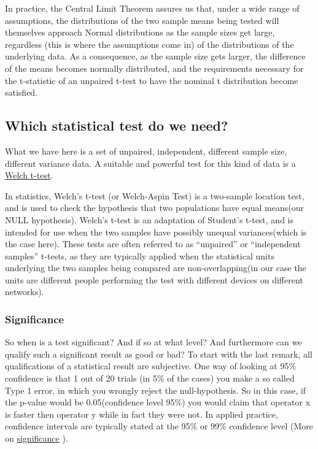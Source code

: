 \documentclass[]{article}
\begin{document}
In practice, the Central Limit Theorem assures us that, under a wide
range of assumptions, the distributions of the two sample means being
tested will themselves approach Normal distributions as the sample sizes
get large, regardless (this is where the assumptions come in) of the
distributions of the underlying data. As a consequence, as the sample
size gets larger, the difference of the means becomes normally
distributed, and the requirements necessary for the t-statistic of an
unpaired t-test to have the nominal t distribution become satisfied.

\subsection{Which statistical test do we
need?}\label{which-statistical-test-do-we-need}

What we have here is a set of unpaired, independent, different sample
size, different variance data. A suitable and powerful test for this
kind of data is a
\href{https://en.wikipedia.org/wiki/Welch\%27s_t_test}{Welch t-test}.

In statistics, Welch's t-test (or Welch-Aspin Test) is a two-sample
location test, and is used to check the hypothesis that two populations
have equal means(our NULL hypothesis). Welch's t-test is an adaptation
of Student's t-test, and is intended for use when the two samples have
possibly unequal variances(which is the case here). These tests are
often referred to as ``unpaired'' or ``independent samples'' t-tests, as
they are typically applied when the statistical units underlying the two
samples being compared are non-overlapping(in our case the units are
different people performing the test with different devices on different
networks).

\subsubsection{Significance}\label{significance}

So when is a test significant? And if so at what level? And furthermore
can we qualify such a significant result as good or bad? To start with
the last remark, all qualifications of a statistical result are
subjective. One way of looking at 95\% confidence is that 1 out of 20
trials (in 5\% of the cases) you make a so called Type 1 error, in which
you wrongly reject the null-hypothesis. So in this case, if the p-value
would be 0.05(confidence level 95\%) you would claim that operator x is
faster then operator y while in fact they were not. In applied practice,
confidence intervals are typically stated at the 95\% or 99\% confidence
level (More on
\href{https://en.wikipedia.org/wiki/Statistical_significance}{significance}
).
\end{document}
